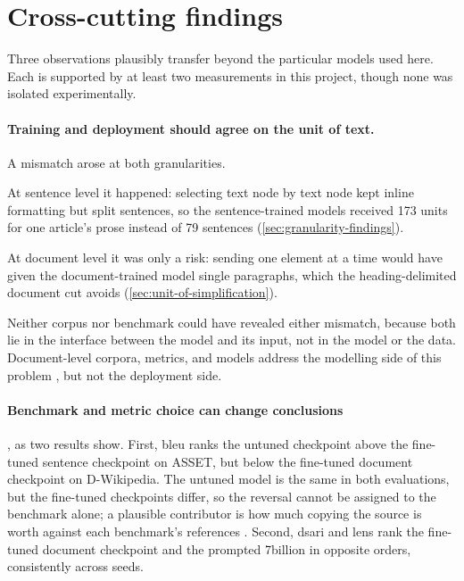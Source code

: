 \section{Cross-cutting findings}
\label{sec:cross-cutting}

Three observations plausibly transfer beyond the particular models used here.
Each is supported by at least two measurements in this project, though none was isolated experimentally.

\paragraph{Training and deployment should agree on the unit of text.}
A mismatch arose at both granularities.

At sentence level it happened: selecting text node by text node kept inline formatting but split sentences, so the sentence-trained models received \num{173} units for one article's prose instead of 79 sentences (\cref{sec:granularity-findings}).

At document level it was only a risk: sending one element at a time would have given the document-trained model single paragraphs, which the heading-delimited document cut avoids (\cref{sec:unit-of-simplification}).

\pagebreak

Neither corpus nor benchmark could have revealed either mismatch, because both lie in the interface between the model and its input, not in the model or the data.
Document-level corpora, metrics, and models address the modelling side of this problem \parencites[7999, 8002]{sun-etal-2021-document}[1, 3]{vasquezrodriguez2024simple}, but not the deployment side.

\paragraph{Benchmark and metric choice can change conclusions}, as two results show.
First, \gls{bleu} ranks the untuned checkpoint above the fine-tuned sentence checkpoint on ASSET, but below the fine-tuned document checkpoint on D-Wikipedia.
The untuned model is the same in both evaluations, but the fine-tuned checkpoints differ, so the reversal cannot be assigned to the benchmark alone; a plausible contributor is how much copying the source is worth against each benchmark's references \parencite[404, 410]{xu-etal-2016-optimizing}.
Second, \gls{dsari} and \gls{lens} rank the fine-tuned document checkpoint and the prompted 7\gls{billion} in opposite orders, consistently across seeds.

